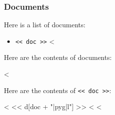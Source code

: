 \documentclass[12pt]{article}
\begin{document}
\subsubsection*{Documents}

Here is a list of documents:

\begin{itemize}
<%
\item{\verb|<< doc >>|}
<%
\end{itemize}

Here are the contents of documents:

<%

Here are the contents of \verb|<< doc >>|:

<%
<< d[doc + "|pyg|l"] >>
<%
<%
\end{document}
